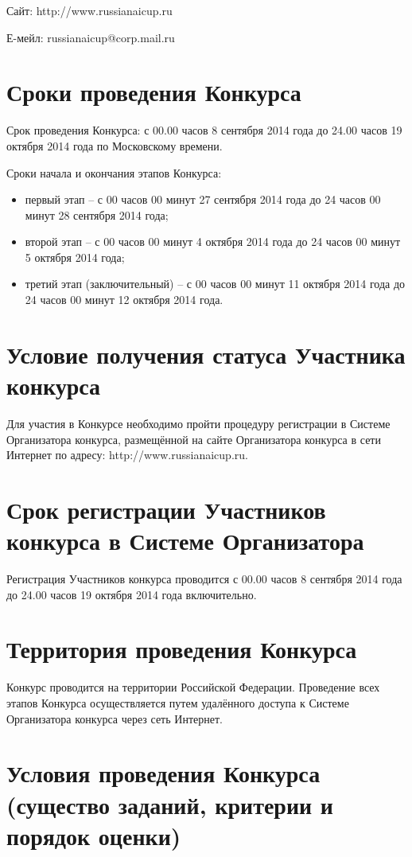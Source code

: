 Сайт: http://www.russianaicup.ru

Е-мейл: russianaicup@corp.mail.ru

\section{Сроки проведения Конкурса}

Срок проведения Конкурса: с 00.00 часов 8 сентября 2014 года до 24.00 часов 19 октября 2014 года по Московскому времени.

Сроки начала и окончания этапов Конкурса:
\begin{itemize}
\item первый этап – с 00 часов 00 минут 27 сентября 2014 года до 24 часов 00 минут 28 сентября 2014 года;
\item второй этап – с 00 часов 00 минут 4 октября 2014 года до 24 часов 00 минут 5 октября 2014 года;
\item третий этап (заключительный) – с 00 часов 00 минут 11 октября 2014 года до 24 часов 00 минут 12 октября 2014 года.
\end{itemize}

\section{Условие получения статуса Участника конкурса}

Для участия в Конкурсе необходимо пройти процедуру регистрации в Системе Организатора конкурса, размещённой на сайте Организатора конкурса в
сети Интернет по адресу: http://www.russianaicup.ru.

\section{Срок регистрации Участников конкурса в Системе Организатора}

Регистрация Участников конкурса проводится с 00.00 часов 8 сентября 2014 года до 24.00 часов 19 октября 2014 года включительно.

\section{Территория проведения Конкурса}

Конкурс проводится на территории Российской Федерации. Проведение всех этапов Конкурса осуществляется путем удалённого доступа к Системе
Организатора конкурса через сеть Интернет.

\section{Условия проведения Конкурса (существо заданий, критерии и порядок оценки)}

